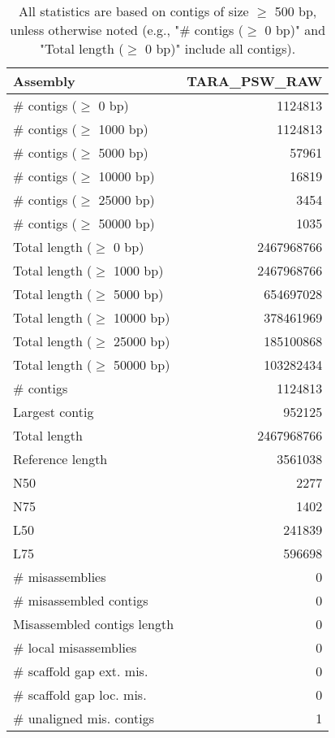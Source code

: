 \documentclass[12pt,a4paper]{article}
\begin{document}
\begin{table}[ht]
\begin{center}
\caption{All statistics are based on contigs of size $\geq$ 500 bp, unless otherwise noted (e.g., "\# contigs ($\geq$ 0 bp)" and "Total length ($\geq$ 0 bp)" include all contigs).}
\begin{tabular}{|l*{1}{|r}|}
\hline
Assembly & TARA\_PSW\_RAW \\ \hline
\# contigs ($\geq$ 0 bp) & 1124813 \\ \hline
\# contigs ($\geq$ 1000 bp) & 1124813 \\ \hline
\# contigs ($\geq$ 5000 bp) & 57961 \\ \hline
\# contigs ($\geq$ 10000 bp) & 16819 \\ \hline
\# contigs ($\geq$ 25000 bp) & 3454 \\ \hline
\# contigs ($\geq$ 50000 bp) & 1035 \\ \hline
Total length ($\geq$ 0 bp) & 2467968766 \\ \hline
Total length ($\geq$ 1000 bp) & 2467968766 \\ \hline
Total length ($\geq$ 5000 bp) & 654697028 \\ \hline
Total length ($\geq$ 10000 bp) & 378461969 \\ \hline
Total length ($\geq$ 25000 bp) & 185100868 \\ \hline
Total length ($\geq$ 50000 bp) & 103282434 \\ \hline
\# contigs & 1124813 \\ \hline
Largest contig & 952125 \\ \hline
Total length & 2467968766 \\ \hline
Reference length & 3561038 \\ \hline
N50 & 2277 \\ \hline
N75 & 1402 \\ \hline
L50 & 241839 \\ \hline
L75 & 596698 \\ \hline
\# misassemblies & 0 \\ \hline
\# misassembled contigs & 0 \\ \hline
Misassembled contigs length & 0 \\ \hline
\# local misassemblies & 0 \\ \hline
\# scaffold gap ext. mis. & 0 \\ \hline
\# scaffold gap loc. mis. & 0 \\ \hline
\# unaligned mis. contigs & 1 \\ \hline

\end{tabular}
\end{center}
\end{table}
\end{document}

